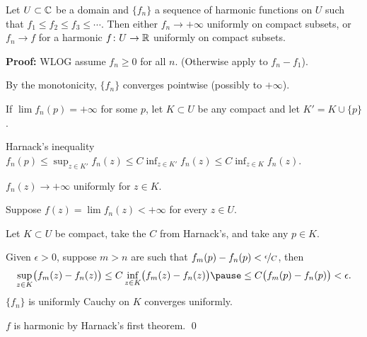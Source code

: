 \documentclass[10pt,aspectratio=169]{beamer}
\begin{document}
\begin{frame}

\begin{theorem}
Let $U \subset {\mathbb{C}}$ be a domain and $\{ f_n \}$ a sequence of
harmonic functions on $U$ such that $f_1 \leq f_2 \leq f_3 \leq \cdots$.
Then either $f_n \to +\infty$ uniformly on compact subsets, or
$f_n \to f$ for a harmonic $f \colon U \to {\mathbb{R}}$ uniformly on compact subsets.
\end{theorem}

\pause

\textbf{Proof:}
WLOG assume $f_n \geq 0$ for all $n$.  (Otherwise apply to 
$f_n-f_1$).

\pause

By the monotonicity, $\{f_n\}$ converges pointwise (possibly to $+\infty$).

\pause

If $\lim f_n(p) = +\infty$ for some $p$,
\pause
let $K \subset U$ be any compact and let $K' = K \cup \{ p \}$.

\medskip
\pause
Harnack's inequality \wthus
$\displaystyle f_n(p) \leq \sup_{z \in K'} f_n(z) \leq C \inf_{z\in K'} f_n(z) \leq C \inf_{z\in K} f_n(z)$.

\medskip
\pause
\thus \quad
$f_n(z) \to +\infty$ uniformly for $z \in K$.

\medskip
\pause

Suppose $f(z) = \lim f_n(z) < +\infty$ for every $z \in U$.

\pause
Let $K \subset U$ be compact, take the $C$ from Harnack's, and take any $p \in K$.

\pause

Given $\epsilon > 0$, suppose $m > n$ are 
such that $f_m(p)-f_n(p) < \nicefrac{\epsilon}{C}$,
\pause
then
\[
\sup_{z \in K} \bigl( f_m(z)- f_n(z) \bigr)
\leq
C \inf_{z\in K} \bigl( f_m(z)-f_n(z) \bigr)
\pause
\leq
C \bigl( f_m(p)-f_n(p) \bigr)
< \epsilon .
\]
\pause
\thus \quad
$\{ f_n \}$ is uniformly Cauchy on $K$
\pause
\wthus
converges uniformly.
\pause

$f$ is harmonic by Harnack's first theorem.
\qed
\end{frame}
\end{document}
